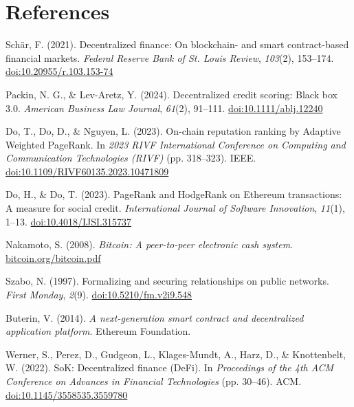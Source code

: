 \clearpage
\chapter{References}
\label{ch:references}

\begin{enumerate}[label={[\arabic*]}, leftmargin=*, itemsep=0.35em, parsep=0pt]
  \item{}\label{ref:1} Sch\"{a}r, F. (2021). Decentralized finance: On blockchain- and smart contract-based financial markets. \textit{Federal Reserve Bank of St. Louis Review}, \textit{103}(2), 153--174. \href{https://doi.org/10.20955/r.103.153-74}{doi:10.20955/r.103.153-74}
  \item{}\label{ref:2} Packin, N. G., \& Lev-Aretz, Y. (2024). Decentralized credit scoring: Black box 3.0. \textit{American Business Law Journal}, \textit{61}(2), 91--111. \href{https://doi.org/10.1111/ablj.12240}{doi:10.1111/ablj.12240}
  \item{}\label{ref:3} Do, T., Do, D., \& Nguyen, L. (2023). On-chain reputation ranking by Adaptive Weighted PageRank. In \textit{2023 RIVF International Conference on Computing and Communication Technologies (RIVF)} (pp. 318--323). IEEE. \href{https://doi.org/10.1109/RIVF60135.2023.10471809}{doi:10.1109/RIVF60135.2023.10471809}
  \item{}\label{ref:4} Do, H., \& Do, T. (2023). PageRank and HodgeRank on Ethereum transactions: A measure for social credit. \textit{International Journal of Software Innovation}, \textit{11}(1), 1--13. \href{https://doi.org/10.4018/IJSI.315737}{doi:10.4018/IJSI.315737}
  \item{}\label{ref:5} Nakamoto, S. (2008). \textit{Bitcoin: A peer-to-peer electronic cash system}. \href{https://bitcoin.org/bitcoin.pdf}{bitcoin.org/bitcoin.pdf}
  \item{}\label{ref:6} Szabo, N. (1997). Formalizing and securing relationships on public networks. \textit{First Monday}, \textit{2}(9). \href{https://doi.org/10.5210/fm.v2i9.548}{doi:10.5210/fm.v2i9.548}
  \item{}\label{ref:7} Buterin, V. (2014). \textit{A next-generation smart contract and decentralized application platform}. Ethereum Foundation.
  \item{}\label{ref:8} Werner, S., Perez, D., Gudgeon, L., Klages-Mundt, A., Harz, D., \& Knottenbelt, W. (2022). SoK: Decentralized finance (DeFi). In \textit{Proceedings of the 4th ACM Conference on Advances in Financial Technologies} (pp. 30--46). ACM. \href{https://doi.org/10.1145/3558535.3559780}{doi:10.1145/3558535.3559780}

\end{enumerate}
